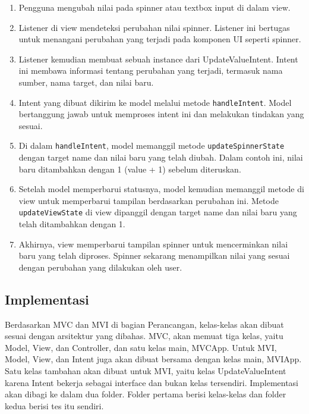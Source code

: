 \documentclass[conference]{IEEEtran}
\begin{document}
\begin{enumerate}
    \item Pengguna mengubah nilai pada spinner atau textbox input di dalam view.
    \item Listener di view mendeteksi perubahan nilai spinner. Listener ini bertugas untuk menangani perubahan yang terjadi pada komponen UI seperti spinner.
    \item Listener kemudian membuat sebuah instance dari UpdateValueIntent. Intent ini membawa informasi tentang perubahan yang terjadi, termasuk nama sumber, nama target, dan nilai baru.
    \item Intent yang dibuat dikirim ke model melalui metode \verb |handleIntent|. Model bertanggung jawab untuk memproses intent ini dan melakukan tindakan yang sesuai.
    \item Di dalam \verb |handleIntent|, model memanggil metode \verb |updateSpinnerState| dengan target name dan nilai baru yang telah diubah. Dalam contoh ini, nilai baru ditambahkan dengan 1 (value + 1) sebelum diteruskan.
    \item Setelah model memperbarui statusnya, model kemudian memanggil metode di view untuk memperbarui tampilan berdasarkan perubahan ini. Metode \verb |updateViewState| di view dipanggil dengan target name dan nilai baru yang telah ditambahkan dengan 1.
    \item Akhirnya, view memperbarui tampilan spinner untuk mencerminkan nilai baru yang telah diproses. Spinner sekarang menampilkan nilai yang sesuai dengan perubahan yang dilakukan oleh user.\\
\end{enumerate}

\subsection{Implementasi}
Berdasarkan MVC dan MVI di bagian Perancangan, kelas-kelas akan dibuat sesuai dengan arsitektur yang dibahas. MVC, akan memuat tiga kelas, yaitu Model, View, dan Controller, dan satu kelas main, MVCApp. Untuk MVI, Model, View, dan Intent juga akan dibuat bersama dengan kelas main, MVIApp. Satu kelas tambahan akan dibuat untuk MVI, yaitu kelas UpdateValueIntent karena Intent bekerja sebagai interface dan bukan kelas tersendiri. Implementasi akan dibagi ke dalam dua folder. Folder pertama berisi kelas-kelas dan folder kedua berisi tes itu sendiri.
\end{document}
